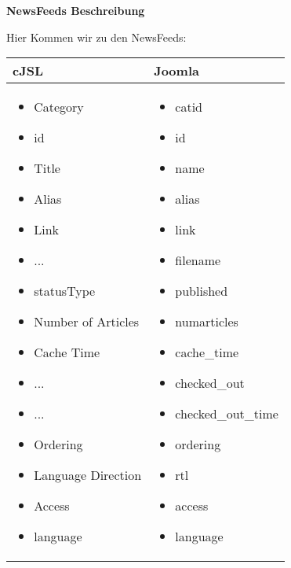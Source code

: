 \textbf{NewsFeeds Beschreibung}

Hier Kommen wir zu den NewsFeeds:

\begin{minipage}{0.7\textwidth}
\begin{tabular}{|p{} | p{}|}
\hline
\textbf{cJSL} & \textbf{Joomla} \\ 
\hline
\begin{itemize}
\item Category
 \item  id
 \item  Title
 \item  Alias
 \item  Link
 \item  ...
 \item  statusType
 \item  Number of Articles
 \item  Cache Time
 \item  ...
 \item  ...
 \item  Ordering
 \item  Language Direction
 \item  Access
 \item  language
 
\end{itemize}
 & 
\begin{itemize}
 \item catid
 \item  id
 \item  name
 \item  alias
 \item  link
 \item  filename
 \item  published
 \item  numarticles
 \item  cache\_time
 \item  checked\_out
 \item  checked\_out\_time
 \item  ordering
 \item  rtl
 \item  access
 \item  language
 
\end{itemize}
\\
\hline
\end{tabular}
\end{minipage}

